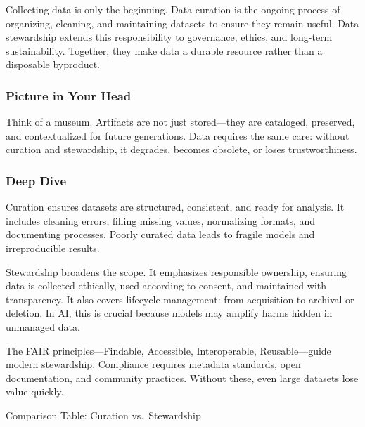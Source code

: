 \documentclass[
  letterpaper,
  DIV=11,
  numbers=noendperiod]{scrreprt}
\begin{document}
Collecting data is only the beginning. Data curation is the ongoing
process of organizing, cleaning, and maintaining datasets to ensure they
remain useful. Data stewardship extends this responsibility to
governance, ethics, and long-term sustainability. Together, they make
data a durable resource rather than a disposable byproduct.

\subsubsection{Picture in Your Head}\label{picture-in-your-head-78}

Think of a museum. Artifacts are not just stored---they are cataloged,
preserved, and contextualized for future generations. Data requires the
same care: without curation and stewardship, it degrades, becomes
obsolete, or loses trustworthiness.

\subsubsection{Deep Dive}\label{deep-dive-78}

Curation ensures datasets are structured, consistent, and ready for
analysis. It includes cleaning errors, filling missing values,
normalizing formats, and documenting processes. Poorly curated data
leads to fragile models and irreproducible results.

Stewardship broadens the scope. It emphasizes responsible ownership,
ensuring data is collected ethically, used according to consent, and
maintained with transparency. It also covers lifecycle management: from
acquisition to archival or deletion. In AI, this is crucial because
models may amplify harms hidden in unmanaged data.

The FAIR principles---Findable, Accessible, Interoperable,
Reusable---guide modern stewardship. Compliance requires metadata
standards, open documentation, and community practices. Without these,
even large datasets lose value quickly.

Comparison Table: Curation vs.~Stewardship
\end{document}
